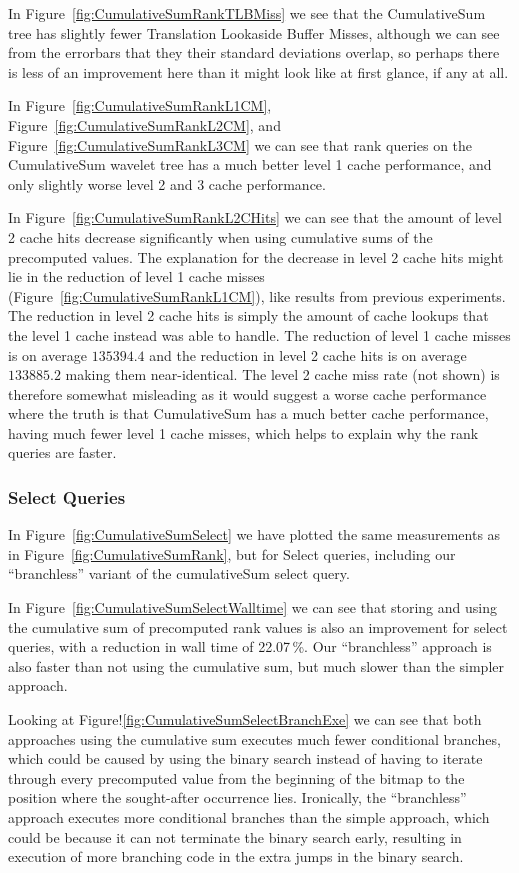 In Figure~\ref{fig:CumulativeSumRankTLBMiss} we see that the CumulativeSum tree has slightly fewer Translation Lookaside Buffer Misses, although we can see from the errorbars that they their standard deviations overlap, so perhaps there is less of an improvement here than it might look like at first glance, if any at all.

In Figure~\ref{fig:CumulativeSumRankL1CM}, Figure~\ref{fig:CumulativeSumRankL2CM}, and Figure~\ref{fig:CumulativeSumRankL3CM} we can see that rank queries on the CumulativeSum wavelet tree has a much better level 1 cache performance, and only slightly worse level 2 and 3 cache performance.

In Figure~\ref{fig:CumulativeSumRankL2CHits} we can see that the amount of level 2 cache hits decrease significantly when using cumulative sums of the precomputed values.
The explanation for the decrease in level 2 cache hits might lie in the reduction of level 1 cache misses (Figure~\ref{fig:CumulativeSumRankL1CM}), like results from previous experiments.
The reduction in level 2 cache hits is simply the amount of cache lookups that the level 1 cache instead was able to handle.
The reduction of level 1 cache misses is on average $\num{135394.4}$ and the reduction in level 2 cache hits is on average $\num{133885.2}$ making them near-identical.
The level 2 cache miss rate (not shown) is therefore somewhat misleading as it would suggest a worse cache performance where the truth is that CumulativeSum has a much better cache performance, having much fewer level 1 cache misses, which helps to explain why the rank queries are faster.



\subsubsection{Select Queries}
\label{sec:cumulativeSumExperimentSelectQueries}
In Figure~\ref{fig:CumulativeSumSelect} we have plotted the same measurements as in Figure~\ref{fig:CumulativeSumRank}, but for Select queries, including our “branchless” variant of the cumulativeSum select query.

In Figure~\ref{fig:CumulativeSumSelectWalltime} we can see that storing and using the cumulative sum of precomputed rank values is also an improvement for select queries, with a reduction in wall time of 22.07\,\%.
Our “branchless” approach is also faster than not using the cumulative sum, but much slower than the simpler approach.

Looking at Figure!\ref{fig:CumulativeSumSelectBranchExe} we can see that both approaches using the cumulative sum executes much fewer conditional branches, which could be caused by using the binary search instead of having to iterate through every precomputed value from the beginning of the bitmap to the position where the sought-after occurrence lies.
Ironically, the “branchless” approach executes more conditional branches than the simple approach, which could be because it can not terminate the binary search early, resulting in execution of more branching code in the extra jumps in the binary search.

